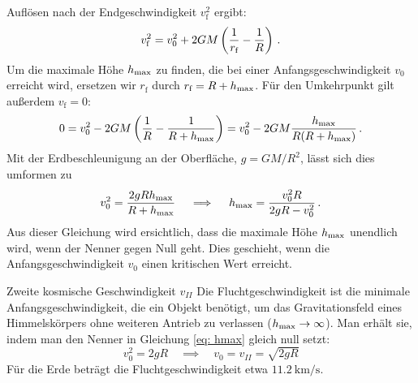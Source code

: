 Auflösen nach der Endgeschwindigkeit $v_{\text{f}}^2$ ergibt:
\begin{equation}\label{eq: vf_general}
    v_{\text{f}}^2 = v_0^2 + 2GM \left( \frac{1}{r_{\text{f}}} - \frac{1}{R} \right)\,.
\end{equation}
Um die maximale Höhe $h_{\mathrm{max}}$ zu finden, die bei einer Anfangsgeschwindigkeit $v_0$ erreicht wird, ersetzen wir $r_{\text{f}}$ durch $r_{\text{f}} = R + h_{\mathrm{max}}$. Für den Umkehrpunkt gilt außerdem $v_{\text{f}} = 0$: 
\begin{equation}
    0 = v_0^2 - 2GM \left( \frac{1}{R} - \frac{1}{R+h_{\mathrm{max}}} \right) = v_0^2 - 2GM \frac{h_{\mathrm{max}}}{R(R+h_{\mathrm{max}})} \,.
\end{equation}
Mit der Erdbeschleunigung an der Oberfläche, $g = GM/R^2$, lässt sich dies umformen zu
\begin{equation}\label{eq: hmax}
    v_0^2 = \frac{2gR h_{\mathrm{max}}}{R+h_{\mathrm{max}}} \quad \implies \quad h_{\mathrm{max}} = \frac{v_0^2 R}{2gR - v_0^2} \,.
\end{equation}
Aus dieser Gleichung wird ersichtlich, dass die maximale Höhe $h_{\mathrm{max}}$ unendlich wird, wenn der Nenner gegen Null geht. Dies geschieht, wenn die Anfangsgeschwindigkeit $v_0$ einen kritischen Wert erreicht.

\begin{importantbox}{Zweite kosmische Geschwindigkeit $v_{II}$}
Die Fluchtgeschwindigkeit ist die minimale Anfangsgeschwindigkeit, die ein Objekt benötigt, um das Gravitationsfeld eines Himmelskörpers ohne weiteren Antrieb zu verlassen ($h_{\mathrm{max}} \to \infty$). Man erhält sie, indem man den Nenner in Gleichung \cref{eq: hmax} gleich null setzt:
\begin{equation}\label{eq: v_escape}
    v_0^2 = 2gR \quad \implies \quad v_0 = v_{II} = \sqrt{2gR}
\end{equation}
Für die Erde beträgt die Fluchtgeschwindigkeit etwa $\SI{11.2}{\kilo\metre\per\second}$. 
\end{importantbox}

\newpage